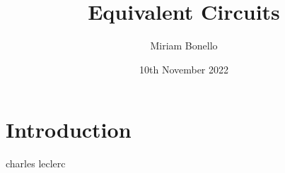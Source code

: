 \documentclass[12pt, a4paper]{article}
\begin{document}
\justifying 
\title{Equivalent Circuits}
\author{Miriam Bonello}
\date{10th November 2022}

\maketitle 

\begin{abstract}
\end{abstract}

\section*{Introduction}\label{section-introduction}
charles leclerc 
\end{document}
